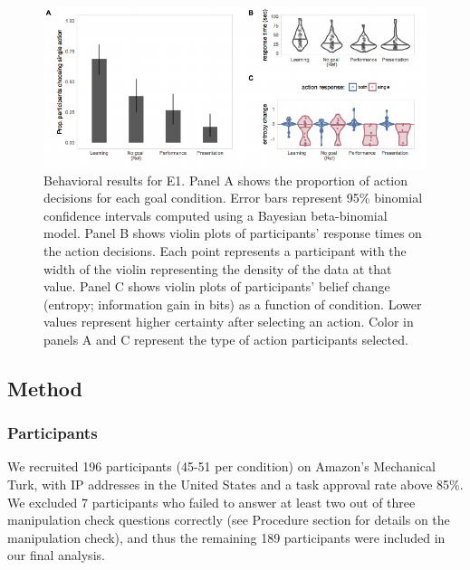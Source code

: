 \documentclass[10pt, letterpaper]{article}
\newenvironment{CodeChunk}{}{}
\begin{document}
\begin{CodeChunk}
\begin{figure}[tb]

{\centering \includegraphics[width=0.95\linewidth]{figs/e1_behav_results_plot-1} 

}

\caption[Behavioral results for E1]{Behavioral results for E1. Panel A shows the proportion of action decisions for each goal condition. Error bars represent 95\% binomial confidence intervals computed using a Bayesian beta-binomial model. Panel B shows violin plots of participants' response times on the action decisions. Each point represents a participant with the width of the violin representing the density of the data at that value. Panel C shows violin plots of participants' belief change (entropy; information gain in bits) as a function of condition. Lower values represent higher certainty after selecting an action. Color in panels A and C represent the type of action participants selected.}\label{fig:e1_behav_results_plot}
\end{figure}
\end{CodeChunk}

\subsection{Method}\label{method}

\subsubsection{Participants}\label{participants}

We recruited 196 participants (45-51 per condition) on Amazon's
Mechanical Turk, with IP addresses in the United States and a task
approval rate above 85\%. We excluded 7 participants who failed to
answer at least two out of three manipulation check questions correctly
(see Procedure section for details on the manipulation check), and thus
the remaining 189 participants were included in our final analysis.
\end{document}
